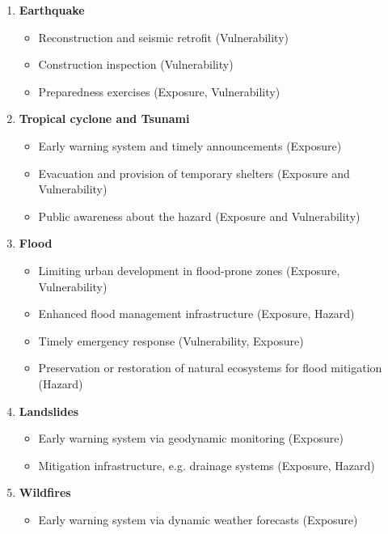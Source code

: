 \begin{enumerate}

    \item \textbf{Earthquake}
    \begin{itemize}
            \item Reconstruction and seismic retrofit (Vulnerability)
            \item Construction inspection (Vulnerability)
            \item Preparedness exercises (Exposure, Vulnerability)
    \end{itemize}
    
    \item \textbf{Tropical cyclone and Tsunami}
    \begin{itemize}
            \item Early warning system and timely announcements (Exposure)
            \item Evacuation and provision of temporary shelters (Exposure and Vulnerability)
            \item Public awareness about the hazard (Exposure and Vulnerability)
    \end{itemize}
    
    \item \textbf{Flood}
    \begin{itemize}
            \item Limiting urban development in flood-prone zones (Exposure, Vulnerability)
            \item Enhanced flood management infrastructure (Exposure, Hazard)
            \item Timely emergency response (Vulnerability, Exposure)
            \item Preservation or restoration of natural ecosystems for flood mitigation (Hazard)
    \end{itemize}

    \item \textbf{Landslides}
    \begin{itemize}
            \item Early warning system via geodynamic monitoring (Exposure)
            \item Mitigation infrastructure, e.g. drainage systems (Exposure, Hazard)
    \end{itemize}

    \item \textbf{Wildfires}
    \begin{itemize}
            \item Early warning system via dynamic weather forecasts (Exposure)
    \end{itemize}

\end{enumerate}


